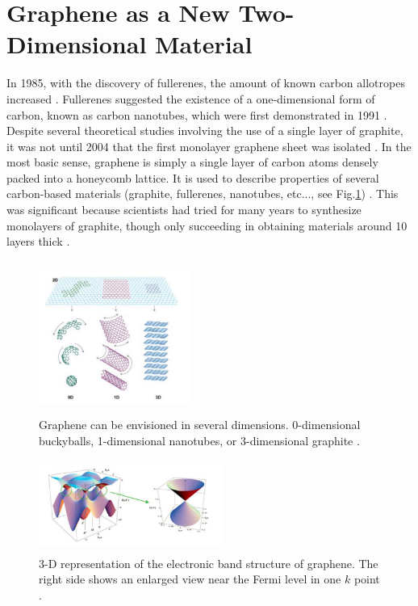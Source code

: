 \documentclass[%
 reprint,
 amsmath,amssymb,
 aps,
pra,
floatfix,
]{revtex4-1}
\begin{document}
\section{\label{sec:graphene_properties} Graphene as a New Two-Dimensional Material}
In 1985, with the discovery of fullerenes, the amount of known carbon allotropes increased \cite{krotoFullerenes1985, nanoscaleReview2011}. Fullerenes suggested the existence of a one-dimensional form of carbon, known as carbon nanotubes, which were first demonstrated in 1991 \cite{iijimaCarbonNanotubes1991}. Despite several theoretical studies involving the use of a single layer of graphite, it was not until 2004 that the first monolayer graphene sheet was isolated \cite{novoselovEtAl2004, novoselovEtAl2005}. In the most basic sense, graphene is simply a single layer of carbon atoms densely packed into a honeycomb lattice. It is used to describe properties of several carbon-based materials (graphite, fullerenes, nanotubes, etc..., see Fig.\ref{fig:sp2}) \cite{Dresselhaus2002, Brenner2002, novoselovEtAl2004}. This was significant because scientists had tried for many years to synthesize monolayers of graphite, though only succeeding in obtaining materials around 10 layers thick \cite{nanoscaleReview2011}.


\begin{figure}
\includegraphics[height=5cm, width=5cm]{../figs/multiDimGraphene}
\caption{Graphene can be envisioned in several dimensions. 0-dimensional buckyballs, 1-dimensional nanotubes, or 3-dimensional graphite \cite{Novoselov2007}.}
\label{fig:sp2}
\end{figure}



\begin{figure}
\includegraphics[height=3cm, width=6cm]{../figs/grapheneBandGap}
\caption{3-D representation of the electronic band structure of graphene. The right side shows an enlarged view near the Fermi level in one $k$ point \cite{nanoscaleReview2011}.}
\label{fig:grapheneBands}
\end{figure}
\end{document}
